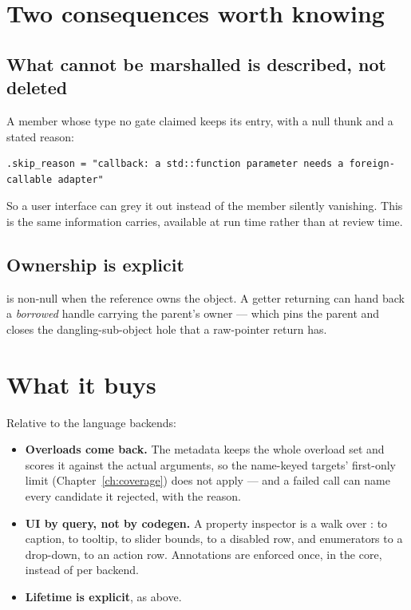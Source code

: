 \section{Two consequences worth knowing}

\subsection*{What cannot be marshalled is described, not deleted}

A member whose type no gate claimed keeps its entry, with a null thunk and a
stated reason:

\begin{lstlisting}[style=cpp]
.skip_reason = "callback: a std::function parameter needs a foreign-callable adapter"
\end{lstlisting}

So a user interface can grey it out instead of the member silently vanishing.
This is the same information  carries, available at run time
rather than at review time.

\subsection*{Ownership is explicit}

 is non-null when the reference owns the object. A getter
returning  can hand back a \emph{borrowed} handle carrying the
parent's owner --- which pins the parent and closes the dangling-sub-object hole
that a raw-pointer return has.

\section{What it buys}

Relative to the language backends:

\begin{itemize}
  \item \textbf{Overloads come back.} The metadata keeps the whole overload set
    and scores it against the actual arguments, so the name-keyed targets'
    first-only limit (Chapter~\ref{ch:coverage}) does not apply --- and a failed
    call can name every candidate it rejected, with the reason.
  \item \textbf{UI by query, not by codegen.} A property inspector is a walk
    over :  to caption,  to tooltip,
     to slider bounds,  to a disabled row,
     and enumerators to a drop-down,  to an action
    row. Annotations are enforced once, in the core, instead of per backend.
  \item \textbf{Lifetime is explicit}, as above.
\end{itemize}

